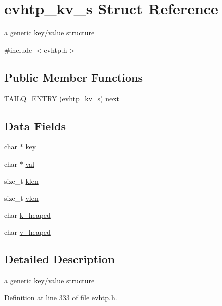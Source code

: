 \hypertarget{structevhtp__kv__s}{\section{evhtp\-\_\-kv\-\_\-s \-Struct \-Reference}
\label{structevhtp__kv__s}
}


a generic key/value structure  




{\ttfamily \#include $<$evhtp.\-h$>$}

\subsection*{\-Public \-Member \-Functions}
\begin{DoxyCompactItemize}
\item 
\hyperlink{structevhtp__kv__s_aa91b5703eb0b48670753f5c6fa38acfe}{\-T\-A\-I\-L\-Q\-\_\-\-E\-N\-T\-R\-Y} (\hyperlink{structevhtp__kv__s}{evhtp\-\_\-kv\-\_\-s}) next
\end{DoxyCompactItemize}
\subsection*{\-Data \-Fields}
\begin{DoxyCompactItemize}
\item 
char $\ast$ \hyperlink{structevhtp__kv__s_a5892a9181e6a332f84d27aecd41dcd12}{key}
\item 
char $\ast$ \hyperlink{structevhtp__kv__s_a1d80a43cb41e5b550d4563dd10d302bc}{val}
\item 
size\-\_\-t \hyperlink{structevhtp__kv__s_a70d958290b8b8ebaff45365d4e5b9e54}{klen}
\item 
size\-\_\-t \hyperlink{structevhtp__kv__s_ac59966c92d67690ef79403b9b2feab88}{vlen}
\item 
char \hyperlink{structevhtp__kv__s_a42db189a7e6b042589175ca83abe94f1}{k\-\_\-heaped}
\item 
char \hyperlink{structevhtp__kv__s_a220b69df8f7b820814ebda4c2df899d8}{v\-\_\-heaped}
\end{DoxyCompactItemize}


\subsection{\-Detailed \-Description}
a generic key/value structure 

\-Definition at line 333 of file evhtp.\-h.



